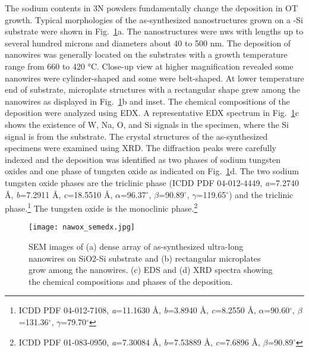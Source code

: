 The sodium contents in 3N powders fundamentally change the deposition in OT growth. Typical morphologies of the as-synthesized nanostructures grown on a -Si substrate were shown in Fig.~\ref{fig:nawoxsemedx}a. The nanostructures were \glspl{nw} with lengths up to several hundred microns and diameters about 40 to 500 nm. The deposition of nanowires was generally located on the substrates with a growth temperature range from 660 to 420 \si{\degreeCelsius}. Close-up view at higher magnification revealed some nanowires were cylinder-shaped and some were belt-shaped. At lower temperature end of substrate, microplate structures with a rectangular shape grew among the nanowires as displayed in Fig.~\ref{fig:nawoxsemedx}b and inset. The chemical compositions of the deposition were analyzed using EDX. A representative EDX spectrum in Fig.~\ref{fig:nawoxsemedx}c shows the existence of W, Na, O, and Si signals in the specimen, where the Si signal is from the substrate. The crystal structures of the as-synthesized specimens were examined using XRD. The diffraction peaks were carefully indexed and the deposition was identified as two phases of sodium tungsten oxides and one phase of tungsten oxide as indicated on Fig.~\ref{fig:nawoxsemedx}d. The two sodium tungsten oxide phases are the triclinic  phase (ICDD PDF 04-012-4449, \emph{a}=7.2740 \AA, \emph{b}=7.2911 \AA, \emph{c}=18.5510 \AA, $\alpha$=96.37$^\circ$, $\beta$=90.89$^\circ$, $\gamma$=119.65$^\circ$) and the triclinic  phase.\footnote{ICDD PDF 04-012-7108, \emph{a}=11.1630 \AA, \emph{b}=3.8940 \AA, \emph{c}=8.2550 \AA, $\alpha$=90.60$^\circ$, $\beta$=131.36$^\circ$, $\gamma$=79.70$^\circ$} The tungsten oxide is the monoclinic  phase.\footnote{ICDD PDF 01-083-0950, \emph{a}=7.30084 \AA, \emph{b}=7.53889 \AA, \emph{c}=7.6896 \AA, $\beta$=90.89$^\circ$}

\begin{figure}[htb]
\centering
\texttt{[image: nawox\_semedx.jpg]}
\caption[SEM and EDX on ]{SEM images of (a) dense array of as-synthesized ultra-long nanowires on SiO2-Si substrate and (b) rectangular microplates grow among the nanowires. (c) EDS and (d) XRD spectra showing the chemical compositions and phases of the deposition.}
\label{fig:nawoxsemedx}
\end{figure}

